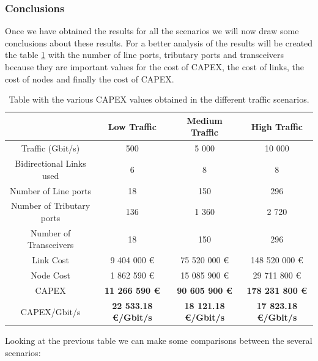 \vspace{13pt}
\subsubsection{Conclusions}

Once we have obtained the results for all the scenarios we will now draw some conclusions about these results. For a better analysis of the results will be created the table \ref{table_comparative_opaque_surv} with the number of line ports, tributary ports and transceivers because they are important values for the cost of CAPEX, the cost of links, the cost of nodes and finally the cost of CAPEX.\\

\begin{table}[h!]
\centering
\begin{tabular}{| c | c | c | c |}
 \hline
  & Low Traffic & Medium Traffic  & High Traffic \\
 \hline\hline
 Traffic (Gbit/s) & 500 & 5 000 & 10 000 \\ \hline
 Bidirectional Links used & 6 & 8 & 8 \\ \hline
 Number of Line ports & 18 & 150 & 296 \\ \hline
 Number of Tributary ports & 136 & 1 360 & 2 720 \\ \hline
 Number of Transceivers & 18 & 150 & 296 \\ \hline
 Link Cost & 9 404 000 \euro & 75 520 000 \euro & 148 520 000 \euro \\ \hline
 Node Cost & 1 862 590 \euro & 15 085 900 \euro & 29 711 800 \euro \\ \hline
 CAPEX & \textbf{11 266 590 \euro} & \textbf{90 605 900 \euro} & \textbf{178 231 800 \euro} \\ \hline
 CAPEX/Gbit/s & \textbf{22 533.18 \euro/Gbit/s} & \textbf{18 121.18 \euro/Gbit/s} & \textbf{17 823.18 \euro/Gbit/s}\\
 \hline
\end{tabular}
\caption{Table with the various CAPEX values obtained in the different traffic scenarios.}
\label{table_comparative_opaque_surv}
\end{table}

\newpage
Looking at the previous table we can make some comparisons between the several scenarios:


